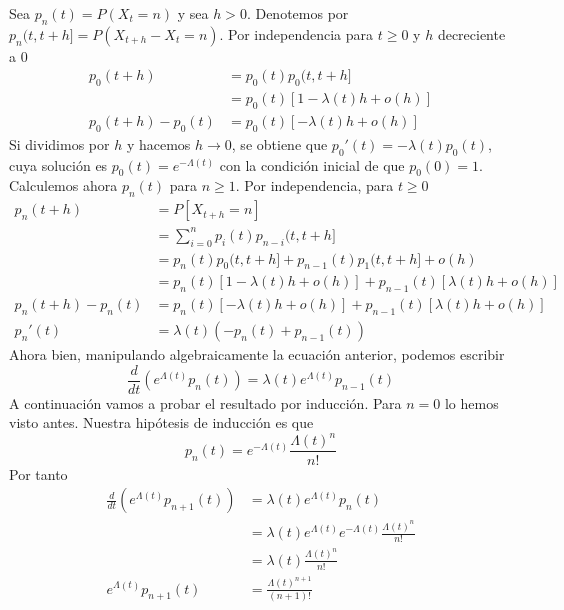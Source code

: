 \documentclass[PREyA.tex]{subfiles}
\begin{document}
\begin{dem}
		Sea $p_{n}(t) = P(X_{t} = n ) $ y sea $h>0$. Denotemos por $p_{n} (t,t+h] =P(X_{t+h}-X_{t}=n)$. Por independencia para $ t \geq 0$ y $h$ decreciente a 0
\begin{align*}
p_{0}(t+h)&= p_{0}(t) p_{0}(t,t+h]\\
& = p_{0}(t)[1- \lambda(t)h +o(h)]\\
p_0(t+h)-p_0(t) &= p_{0}(t)[-\lambda(t)h + o(h)]
\end{align*}
Si dividimos por $h$ y hacemos $h\to 0$, se obtiene que $p_{0}'(t) = -\lambda(t)p_{0}(t)$, cuya solución es $p_{0}(t)=e^{-\Lambda(t)}$ con la condición inicial de que $p_0(0)=1$. Calculemos ahora $p_{n}(t)$ para $n \geq 1$. Por independencia, para $t \geq 0$
\begin{align*}
p_n(t+h)&=P[X_{t+h}=n]\\
&=\sum_{i=0}^n p_i(t)p_{n-i}(t,t+h]\\
&= p_n(t)p_0(t,t+h] + p_{n-1}(t)p_1(t,t+h]+o(h)\\
&= p_{n}(t) [1- \lambda(t)h +o(h)] + p_{n-1}(t)[\lambda(t)h+o(h)] \\
p_n(t+h) - p_n(t) &= p_n(t)[-\lambda(t)h+o(h)]+p_{n-1}(t)[\lambda(t)h+o(h)]\\
p_n'(t)&=\lambda(t)(-p_n(t)+p_{n-1}(t))
\end{align*}
Ahora bien, manipulando algebraicamente la ecuación anterior, podemos escribir
$$
\frac{d}{dt}\left(e^{\Lambda(t)}p_n(t)\right) = \lambda(t)e^{\Lambda(t)}p_{n-1}(t)
$$
A continuación vamos a probar el resultado por inducción. Para $n=0$ lo hemos visto antes. Nuestra hipótesis de inducción es que
$$
p_n(t)=e^{-\Lambda(t)}\frac{\Lambda(t)^n}{n!}
$$
Por tanto
\begin{align*}
\frac{d}{dt}\left(e^{\Lambda(t)}p_{n+1}(t)\right) &= \lambda(t)e^{\Lambda(t)}p_{n}(t)\\
&= \lambda(t)e^{\Lambda(t)}e^{-\Lambda(t)}\frac{\Lambda(t)^n}{n!}\\
&=\lambda(t)\frac{\Lambda(t)^n}{n!}\\
e^{\Lambda(t)}p_{n+1}(t) &= \frac{\Lambda(t)^{n+1}}{(n+1)!}
\end{align*}
\end{dem}
\end{document}
